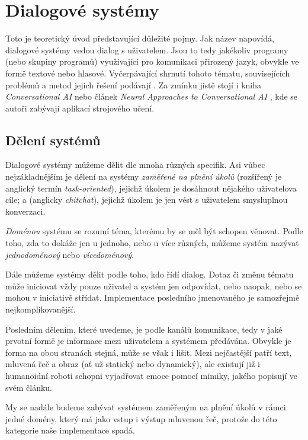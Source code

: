 
\chapter{Dialogové systémy}

Toto je teoretický úvod představující důležité pojmy.
Jak název napovídá, dialogové systémy vedou dialog s uživatelem. Jsou to
tedy jakékoliv programy (nebo skupiny programů) využívající
pro komunikaci přirozený jazyk, obvykle ve formě textové nebo hlasové.
Vyčerpávající shrnutí tohoto tématu, souvisejících problémů a metod
jejich řešení podávají \citet{jurafsky_slp_2020}. Za zmínku jistě stojí
i kniha \textit{Conversational AI} \citep{mctear_conversational_2020} nebo
článek \textit{Neural Approaches to Conversational AI} \citep{gao_neural_2019},
kde se autoři zabývají aplikací strojového učení.

\section{Dělení systémů}
Dialogové systémy můžeme dělit dle mnoha různých specifik. Asi vůbec
nejzákladnějším je dělení na systémy \textit{zaměřené na plnění úkolů}
(rozšířený je anglický termín \textit{task-oriented}), jejichž úkolem
je dosáhnout nějakého uživatelova cíle; a  (anglicky
\textit{chitchat}), jejichž úkolem je jen vést s uživatelem smysluplnou
konverzaci.

\textit{Doménou} systému se rozumí téma, kterému by se měl být schopen
věnovat. Podle toho, zda to dokáže jen u jednoho, nebo u více různých,
můžeme systém nazývat \textit{jednodoménový} nebo \textit{vícedoménový}.

Dále můžeme systémy dělit podle toho, kdo řídí dialog. Dotaz či změnu tématu
může iniciovat vždy pouze uživatel a systém jen odpovídat, nebo naopak, nebo
se mohou v iniciativě střídat. Implementace posledního jmenovaného je samozřejmě
nejkomplikovanější.

Posledním dělením, které uvedeme, je podle kanálů komunikace, tedy
v jaké prvotní formě je informace mezi uživatelem a systémem předávána.
Obvykle je forma na obou stranách stejná, může se však i lišit. Mezi
nejčastější patří text, mluvená řeč a obraz (ať už statický nebo
dynamický), ale existují již i humanoidní roboti schopni vyjadřovat emoce pomocí
mimiky, jakého popisují \citet{faraj_facially_2021} ve svém článku.

My se nadále budeme zabývat systémem zaměřeným na plnění úkolů v rámci jedné
domény, který má jako vstup i výstup mluvenou řeč, protože do této kategorie
naše implementace spadá.

